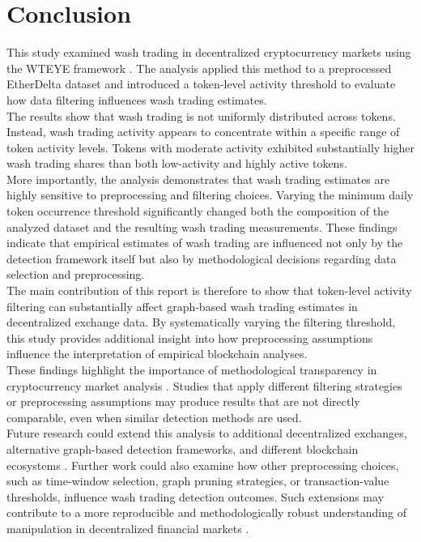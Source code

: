 \documentclass[language=english,thesis=bachelor,nosecondtitle,faculty=cb,onesided,13pt]{hsmw-thesis}
\begin{document}
\chapter{Conclusion}
This study examined wash trading in decentralized cryptocurrency markets using the WTEYE framework \cite{cui2023chain}. The analysis applied this method to a preprocessed EtherDelta dataset and introduced a token-level activity threshold to evaluate how data filtering influences wash trading estimates.\\
The results show that wash trading is not uniformly distributed across tokens. Instead, wash trading activity appears to concentrate within a specific range of token activity levels. Tokens with moderate activity exhibited substantially higher wash trading shares than both low-activity and highly active tokens.\\
More importantly, the analysis demonstrates that wash trading estimates are highly sensitive to preprocessing and filtering choices. Varying the minimum daily token occurrence threshold significantly changed both the composition of the analyzed dataset and the resulting wash trading measurements. These findings indicate that empirical estimates of wash trading are influenced not only by the detection framework itself but also by methodological decisions regarding data selection and preprocessing.\\
The main contribution of this report is therefore to show that token-level activity filtering can substantially affect graph-based wash trading estimates in decentralized exchange data. By systematically varying the filtering threshold, this study provides additional insight into how preprocessing assumptions influence the interpretation of empirical blockchain analyses.\\
These findings highlight the importance of methodological transparency in cryptocurrency market analysis \cite{victor2021detecting, cui2023chain}. Studies that apply different filtering strategies or preprocessing assumptions may produce results that are not directly comparable, even when similar detection methods are used.\\
Future research could extend this analysis to additional decentralized exchanges, alternative graph-based detection frameworks, and different blockchain ecosystems \cite{cong2023crypto, victor2021detecting}. Further work could also examine how other preprocessing choices, such as time-window selection, graph pruning strategies, or transaction-value thresholds, influence wash trading detection outcomes. Such extensions may contribute to a more reproducible and methodologically robust understanding of manipulation in decentralized financial markets \cite{cong2023crypto, victor2021detecting, cui2023chain}.
\end{document}
